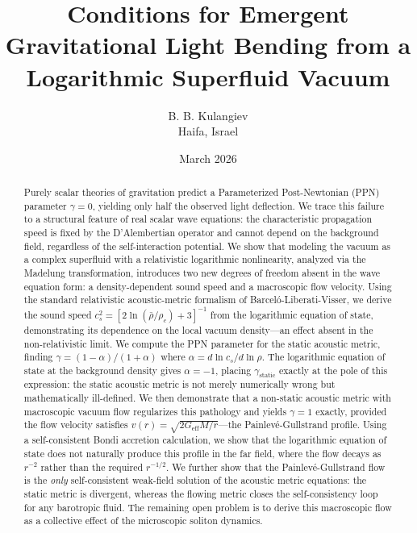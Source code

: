 \documentclass[12pt, a4paper]{article}
\begin{document}
\title{Conditions for Emergent Gravitational Light Bending from a Logarithmic Superfluid Vacuum}

\author{B. B. Kulangiev\\\small{Haifa, Israel} }
\date{March 2026}
\maketitle

\begin{abstract}
\noindent Purely scalar theories of gravitation predict a Parameterized Post-Newtonian (PPN) parameter $\gamma = 0$, yielding only half the observed light deflection. We trace this failure to a structural feature of real scalar wave equations: the characteristic propagation speed is fixed by the D'Alembertian operator and cannot depend on the background field, regardless of the self-interaction potential. We show that modeling the vacuum as a complex superfluid with a relativistic logarithmic nonlinearity, analyzed via the Madelung transformation, introduces two new degrees of freedom absent in the wave equation form: a density-dependent sound speed and a macroscopic flow velocity. Using the standard relativistic acoustic-metric formalism of Barcel\'{o}-Liberati-Visser, we derive the sound speed $c_s^2 = [2\ln(\bar{\rho}/\rho_c) + 3]^{-1}$ from the logarithmic equation of state, demonstrating its dependence on the local vacuum density---an effect absent in the non-relativistic limit. We compute the PPN parameter for the static acoustic metric, finding $\gamma = (1-\alpha)/(1+\alpha)$ where $\alpha = d\ln c_s/d\ln\rho$. The logarithmic equation of state at the background density gives $\alpha = -1$, placing $\gamma_{\mathrm{static}}$ exactly at the pole of this expression: the static acoustic metric is not merely numerically wrong but mathematically ill-defined. We then demonstrate that a non-static acoustic metric with macroscopic vacuum flow regularizes this pathology and yields $\gamma = 1$ exactly, provided the flow velocity satisfies $v(r) = \sqrt{2G_{\mathrm{eff}}M/r}$---the Painlev\'{e}-Gullstrand profile. Using a self-consistent Bondi accretion calculation, we show that the logarithmic equation of state does not naturally produce this profile in the far field, where the flow decays as $r^{-2}$ rather than the required $r^{-1/2}$. We further show that the Painlev\'{e}-Gullstrand flow is the \emph{only} self-consistent weak-field solution of the acoustic metric equations: the static metric is divergent, whereas the flowing metric closes the self-consistency loop for any barotropic fluid. The remaining open problem is to derive this macroscopic flow as a collective effect of the microscopic soliton dynamics.
\end{abstract}
\end{document}
